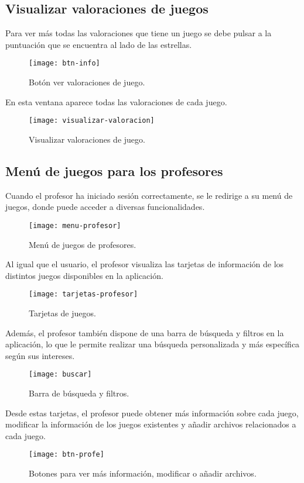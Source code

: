 \subsection{Visualizar valoraciones de juegos}
Para ver más todas las valoraciones que tiene un juego se debe pulsar a la puntuación que se encuentra al lado de las estrellas.
\begin{figure}[htb]
\centering
\texttt{[image: btn-info]}
\caption{Botón ver valoraciones de juego.}
\label{fig:btn-info}
\end{figure}

En esta ventana aparece todas las valoraciones de cada juego.
\begin{figure}[htb]
\centering
\texttt{[image: visualizar-valoracion]}
\caption{Visualizar valoraciones de juego.}
\label{fig:visualizar-valoracion}
\end{figure}

\subsection{Menú de juegos para los profesores}
Cuando el profesor ha iniciado sesión correctamente, se le redirige a su menú de juegos, donde puede acceder a diversas funcionalidades.
\begin{figure}[htb]
\centering
\texttt{[image: menu-profesor]}
\caption{Menú de juegos de profesores.}
\label{fig:menu-profesor}
\end{figure}

Al igual que el usuario, el profesor visualiza las tarjetas de información de los distintos juegos disponibles en la aplicación. 
\begin{figure}[htb]
\centering
\texttt{[image: tarjetas-profesor]}
\caption{Tarjetas de juegos.}
\label{fig:tarjetas-profesor}
\end{figure}

Además, el profesor también dispone de una barra de búsqueda y filtros en la aplicación, lo que le permite realizar una búsqueda personalizada y más específica según sus intereses.
\begin{figure}[htb]
\centering
\texttt{[image: buscar]}
\caption{Barra de búsqueda y filtros.}
\label{fig:buscar}
\end{figure}

Desde estas tarjetas, el profesor puede obtener más información sobre cada juego, modificar la información de los juegos existentes y añadir archivos relacionados a cada juego.
\begin{figure}[htb]
\centering
\texttt{[image: btn-profe]}
\caption{Botones para ver más información, modificar o añadir archivos.}
\label{fig:btn-profe}
\end{figure}


